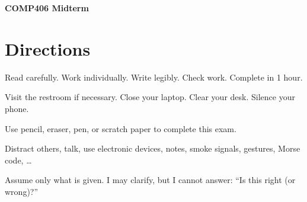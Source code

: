 \documentclass[addpoints]{exam}
\begin{document}
\begin{center}
{\bf COMP406 Midterm}

\end{center}
\vspace{0.2in}

\vspace{0.2in}

\section*{Directions}
Read carefully. Work individually. Write legibly. Check work. Complete in 1 hour.
\begin{description}[leftmargin=!,labelwidth=\widthof{\bfseries Beforehand}]
\item[Beforehand] Visit the restroom if necessary. Close your laptop. Clear your desk. Silence your phone.
\item[DO] Use pencil, eraser, pen, or scratch paper to complete this exam.
\item[DO NOT] Distract others, talk, use electronic devices, notes, smoke signals, gestures, Morse code, \ldots
\item[Confused?] Assume only what is given. I may clarify, but I cannot answer: ``Is this right (or wrong)?''
\end{description}
\end{document}

